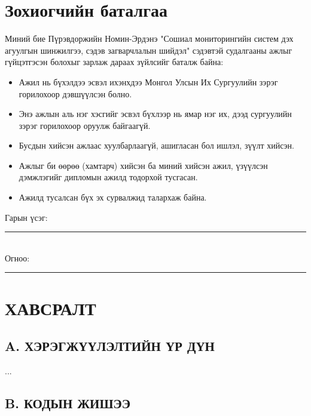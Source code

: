 \documentclass[12pt,a4paper]{report}
\begin{document}
\chapter*{Зохиогчийн баталгаа}
Миний бие Пүрэвдоржийн Номин-Эрдэнэ "Сошиал мониторингийн систем дэх агуулгын шинжилгээ, сэдэв загварчлалын шийдэл" сэдэвтэй судалгааны ажлыг гүйцэтгэсэн болохыг зарлаж дараах зүйлсийг баталж байна:
\begin{itemize}
    \item Ажил нь бүхэлдээ эсвэл ихэнхдээ Монгол Улсын Их Сургуулийн зэрэг горилохоор дэвшүүлсэн болно.
    \item Энэ ажлын аль нэг хэсгийг эсвэл бүхлээр нь ямар нэг их, дээд сургуулийн зэрэг горилохоор оруулж байгаагүй.
    \item Бусдын хийсэн ажлаас хуулбарлаагүй, ашигласан бол ишлэл, зүүлт хийсэн.
    \item Ажлыг би өөрөө (хамтарч) хийсэн ба миний хийсэн ажил, үзүүлсэн дэмжлэгийг дипломын ажилд тодорхой тусгасан.
    \item Ажилд тусалсан бүх эх сурвалжид талархаж байна.
\end{itemize}
\vspace{1cm}
Гарын үсэг: \rule{4cm}{0.4pt} \\
\vspace{0.5cm}
Огноо: \rule{4cm}{0.4pt}

\newpage
\tableofcontents
\newpage
\listoffigures
\newpage
\listoftables

\clearpage
{}







\newpage



\appendix
\chapter*{ХАВСРАЛТ}
\section*{A. ХЭРЭГЖҮҮЛЭЛТИЙН ҮР ДҮН}
...
\section*{B. КОДЫН ЖИШЭЭ}
\end{document}
